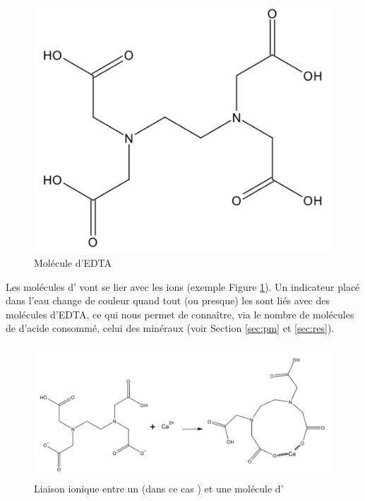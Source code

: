 \documentclass[11pt]{article}
\begin{document}
\begin{figure}[H]
\centering
\includegraphics[scale=0.25]{Divers/edta-ro.pdf}
\caption{Molécule d'EDTA}
\end{figure}

Les molécules d' vont se lier avec les ions  (exemple Figure \ref{fig:ca-edta}). Un indicateur placé dans l'eau change de couleur quand tout (ou presque) les  sont liés avec des molécules d'EDTA, ce qui nous permet de connaître, via le nombre de molécules de d'acide consommé, celui des minéraux (voir Section \ref{sec:pm} et \ref{sec:res}).

\begin{figure}[H]
\centering
\includegraphics[scale=0.75]{Divers/edta_et_ca-ro.pdf}
\caption{Liaison ionique entre un  (dans ce cas ) et une molécule d'}
\label{fig:ca-edta}
\end{figure}
\end{document}
